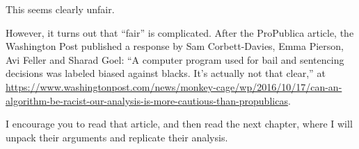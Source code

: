 This seems clearly unfair.

However, it turns out that ``fair'' is complicated. After the ProPublica
article, the Washington Post published a response by Sam Corbett-Davies,
Emma Pierson, Avi Feller and Sharad Goel: ``A computer program used for
bail and sentencing decisions was labeled biased against blacks. It's
actually not that clear,'' at
\url{https://www.washingtonpost.com/news/monkey-cage/wp/2016/10/17/can-an-algorithm-be-racist-our-analysis-is-more-cautious-than-propublicas}.

I encourage you to read that article, and then read the next chapter,
where I will unpack their arguments and replicate their analysis.


